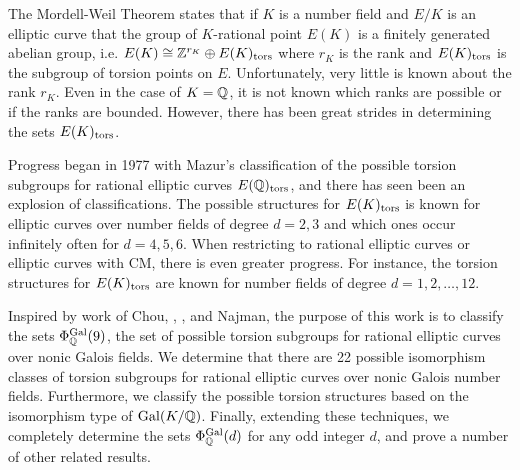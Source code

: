 \pagestyle{empty}
\abstractTitle

 The Mordell-Weil Theorem states that if $K$ is a number field and $E/K$ is an elliptic curve that the group of $K$-rational point $E(K)$ is a finitely generated abelian group, i.e. $E(K) \cong \mathbb{Z}^{r_K} \oplus E(K)_{\text{tors}}$ where $r_K$ is the rank and $E(K)_{\text{tors}}$ is the subgroup of torsion points on $E$. Unfortunately, very little is known about the rank $r_K$. Even in the case of $K= \mathbb{Q}$, it is not known which ranks are possible or if the ranks are bounded. However, there has been great strides in determining the sets $E(K)_{\text{tors}}$. 
 
 
Progress began in 1977 with Mazur's classification of the possible torsion subgroups for rational elliptic curves $E(\mathbb{Q})_{\text{tors}}$, and there has seen been an explosion of classifications. The possible structures for $E(K)_{\text{tors}}$ is known for elliptic curves over number fields of degree $d= 2, 3$ and which ones occur infinitely often for $d= 4, 5, 6$. When restricting to rational elliptic curves or elliptic curves with CM, there is even greater progress. For instance, the torsion structures for $E(K)_{\text{tors}}$ are known for number fields of degree $d= 1, 2, \ldots, 12$. 


Inspired by work of Chou, \gonjim{}, \lozrob{}, and Najman, the purpose of this work is to classify the sets $\Phi_{\mathbb{Q}}^{\operatorname{Gal}}(9)$, the set of possible torsion subgroups for rational elliptic curves over nonic Galois fields. We determine that there are 22 possible isomorphism classes of torsion subgroups for rational elliptic curves over nonic Galois number fields. Furthermore, we classify the possible torsion structures based on the isomorphism type of $\operatorname{Gal}(K/\mathbb{Q})$. Finally, extending these techniques, we completely determine the sets $\Phi_{\mathbb{Q}}^{\operatorname{Gal}}(d)$ for any odd integer $d$, and prove a number of other related results. 